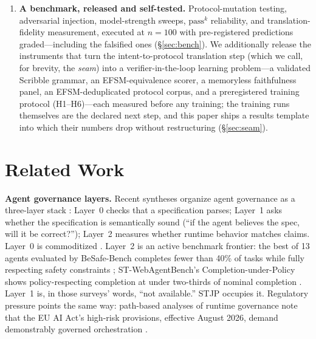 \documentclass{article}
\newcommand{\stjp}{\textsc{STJP}}
\begin{document}
\begin{enumerate}
\item \textbf{A benchmark, released and self-tested.} Protocol-mutation testing, adversarial injection, model-strength sweeps, $\mathrm{pass}^k$ reliability, and translation-fidelity measurement, executed at $n{=}100$ with pre-registered predictions graded---including the falsified ones (\S\ref{sec:bench}). We additionally release the instruments that turn the intent-to-protocol translation step (which we call, for brevity, the \emph{seam}) into a verifier-in-the-loop learning problem---a validated Scribble grammar, an EFSM-equivalence scorer, a memoryless faithfulness panel, an EFSM-deduplicated protocol corpus, and a preregistered training protocol (H1--H6)---each measured before any training; the training runs themselves are the declared next step, and this paper ships a results template into which their numbers drop without restructuring (\S\ref{sec:seam}).
\end{enumerate}

\section{Related Work}\label{sec:related}
\textbf{Agent governance layers.} Recent syntheses organize agent governance as a three-layer stack \citep{governspec,lga}: Layer~0 checks that a specification parses; Layer~1 asks whether the specification is semantically sound (``if the agent believes the spec, will it be correct?''); Layer~2 measures whether runtime behavior matches claims. Layer~0 is commoditized \citep{skilldex}. Layer~2 is an active benchmark frontier: the best of 13 agents evaluated by BeSafe-Bench completes fewer than 40\% of tasks while fully respecting safety constraints \citep{besafe}; ST-WebAgentBench's Completion-under-Policy shows policy-respecting completion at under two-thirds of nominal completion \citep{stweb}. Layer~1 is, in those surveys' words, ``not available.'' \stjp{} occupies it. Regulatory pressure points the same way: path-based analyses of runtime governance note that the EU AI Act's high-risk provisions, effective August 2026, demand demonstrably governed orchestration \citep{pathgov}.
\end{document}
